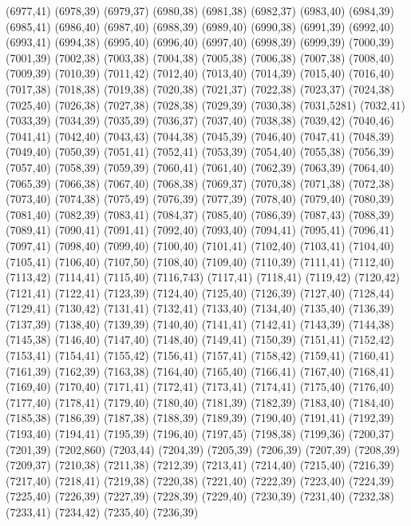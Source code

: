 (6977,41)
(6978,39)
(6979,37)
(6980,38)
(6981,38)
(6982,37)
(6983,40)
(6984,39)
(6985,41)
(6986,40)
(6987,40)
(6988,39)
(6989,40)
(6990,38)
(6991,39)
(6992,40)
(6993,41)
(6994,38)
(6995,40)
(6996,40)
(6997,40)
(6998,39)
(6999,39)
(7000,39)
(7001,39)
(7002,38)
(7003,38)
(7004,38)
(7005,38)
(7006,38)
(7007,38)
(7008,40)
(7009,39)
(7010,39)
(7011,42)
(7012,40)
(7013,40)
(7014,39)
(7015,40)
(7016,40)
(7017,38)
(7018,38)
(7019,38)
(7020,38)
(7021,37)
(7022,38)
(7023,37)
(7024,38)
(7025,40)
(7026,38)
(7027,38)
(7028,38)
(7029,39)
(7030,38)
(7031,5281)
(7032,41)
(7033,39)
(7034,39)
(7035,39)
(7036,37)
(7037,40)
(7038,38)
(7039,42)
(7040,46)
(7041,41)
(7042,40)
(7043,43)
(7044,38)
(7045,39)
(7046,40)
(7047,41)
(7048,39)
(7049,40)
(7050,39)
(7051,41)
(7052,41)
(7053,39)
(7054,40)
(7055,38)
(7056,39)
(7057,40)
(7058,39)
(7059,39)
(7060,41)
(7061,40)
(7062,39)
(7063,39)
(7064,40)
(7065,39)
(7066,38)
(7067,40)
(7068,38)
(7069,37)
(7070,38)
(7071,38)
(7072,38)
(7073,40)
(7074,38)
(7075,49)
(7076,39)
(7077,39)
(7078,40)
(7079,40)
(7080,39)
(7081,40)
(7082,39)
(7083,41)
(7084,37)
(7085,40)
(7086,39)
(7087,43)
(7088,39)
(7089,41)
(7090,41)
(7091,41)
(7092,40)
(7093,40)
(7094,41)
(7095,41)
(7096,41)
(7097,41)
(7098,40)
(7099,40)
(7100,40)
(7101,41)
(7102,40)
(7103,41)
(7104,40)
(7105,41)
(7106,40)
(7107,50)
(7108,40)
(7109,40)
(7110,39)
(7111,41)
(7112,40)
(7113,42)
(7114,41)
(7115,40)
(7116,743)
(7117,41)
(7118,41)
(7119,42)
(7120,42)
(7121,41)
(7122,41)
(7123,39)
(7124,40)
(7125,40)
(7126,39)
(7127,40)
(7128,44)
(7129,41)
(7130,42)
(7131,41)
(7132,41)
(7133,40)
(7134,40)
(7135,40)
(7136,39)
(7137,39)
(7138,40)
(7139,39)
(7140,40)
(7141,41)
(7142,41)
(7143,39)
(7144,38)
(7145,38)
(7146,40)
(7147,40)
(7148,40)
(7149,41)
(7150,39)
(7151,41)
(7152,42)
(7153,41)
(7154,41)
(7155,42)
(7156,41)
(7157,41)
(7158,42)
(7159,41)
(7160,41)
(7161,39)
(7162,39)
(7163,38)
(7164,40)
(7165,40)
(7166,41)
(7167,40)
(7168,41)
(7169,40)
(7170,40)
(7171,41)
(7172,41)
(7173,41)
(7174,41)
(7175,40)
(7176,40)
(7177,40)
(7178,41)
(7179,40)
(7180,40)
(7181,39)
(7182,39)
(7183,40)
(7184,40)
(7185,38)
(7186,39)
(7187,38)
(7188,39)
(7189,39)
(7190,40)
(7191,41)
(7192,39)
(7193,40)
(7194,41)
(7195,39)
(7196,40)
(7197,45)
(7198,38)
(7199,36)
(7200,37)
(7201,39)
(7202,860)
(7203,44)
(7204,39)
(7205,39)
(7206,39)
(7207,39)
(7208,39)
(7209,37)
(7210,38)
(7211,38)
(7212,39)
(7213,41)
(7214,40)
(7215,40)
(7216,39)
(7217,40)
(7218,41)
(7219,38)
(7220,38)
(7221,40)
(7222,39)
(7223,40)
(7224,39)
(7225,40)
(7226,39)
(7227,39)
(7228,39)
(7229,40)
(7230,39)
(7231,40)
(7232,38)
(7233,41)
(7234,42)
(7235,40)
(7236,39)
